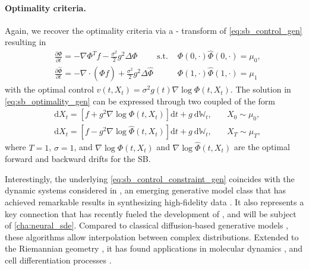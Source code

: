 \paragraph{Optimality criteria.}
Again, we recover the optimality criteria via a \citeauthor{hopf1950partial}-\citeauthor{cole1951quasi} transform  of \eqref{eq:sb_control_gen} resulting in
\begin{align} \label{eq:sb_optimality_gen}
& \frac{\partial \Phi}{\partial t}=-\nabla \Phi^{T } f- \frac{\sigma^2}{2} g^2 \Delta \Phi \quad \quad \text { s.t. } &\Phi(0, \cdot) \widehat{\Phi}(0,  \cdot)=\mu_0, \\
\nonumber & \frac{\partial \widehat{\Phi}}{\partial t}=-\nabla \cdot(\widehat{\Phi} f)+\frac{\sigma^2}{2} g^2 \Delta \widehat{\Phi} \quad &  \Phi(1, \cdot) \widehat{\Phi}(1, \cdot)=\mu_1
\end{align}
with the optimal control $v(t, X_t)= \sigma^2 g(t) \nabla \log \Phi\left(t, X_t\right)$.
The solution in \eqref{eq:sb_optimality_gen} can be expressed through two coupled  of the form \citep{leonard2013survey}
\begin{align}
\label{eq:sb_forward} 
& \mathrm{d} X_t=\left[f+g^2 \nabla \log \Phi\left(t, X_t\right)\right] \mathrm{d} t+g \mathrm{~d} \mathbb{W}_t, \quad & X_0 \sim \mu_0, \\
\label{eq:sb_backward}
& \mathrm{d} X_t=\left[f-g^2 \nabla \log \widehat{\Phi}\left(t, X_t\right)\right] \mathrm{d} t+g \mathrm{~d} \mathbb{W}_t, \quad & X_T \sim \mu_T,
\end{align}
where $T = 1$, $\sigma = 1$, and $\nabla \log \Phi\left(t, X_t\right)$ and $\nabla \log \widehat{\Phi}\left(t, X_t\right)$ are the optimal forward and backward drifts for the \acrlong{SB}.

 Interestingly, the underlying  \eqref{eq:sb_control_constraint_gen} coincides with the dynamic systems considered in  \citep{song2020score}, an emerging generative model class that has achieved remarkable results in synthesizing high-fidelity data \citep{song2019generative, kong2020diffwave}.
It also represents a key connection that has recently fueled the development of  \citep{de2021diffusion, chen2021stochastic, bunne2022recovering, liu2022deep}, and will be subject of \cref{cha:neural_sde}.
Compared to classical diffusion-based generative models \citep{daniels2021score, song2020score}, these algorithms allow interpolation between complex distributions. Extended to the Riemannian geometry \citep{thornton2022riemannian, de2022riemannian}, it has found applications in molecular dynamics \citep{holdijk2022path, somnath2023aligned}, and cell differentiation processes \citep{vargas2021solving, bunne2022recovering, tong2023conditional}.
